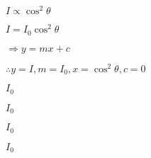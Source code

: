 \documentclass[10pt]{book}
\begin{document}
\begin{mdSnippets}
\begin{mdInlineSnippet}[54c828d34a9ab5de03d1bd36d06f8bfe]%
$I\propto\cos^2\theta$\end{mdInlineSnippet}%
\begin{mdInlineSnippet}[3988589845bbb41b96d667f353b3d1bb]%
$I=I_0\cos^2\theta$\end{mdInlineSnippet}%
\begin{mdInlineSnippet}[053a5864c12b37b85c25fc88ddcedfa4]%
$\Rightarrow y=mx+c$\end{mdInlineSnippet}%
\begin{mdInlineSnippet}[65261bf0f42cf0f16dcf6f6742361736]%
$\therefore y=I, m=I_0, x=\cos^2\theta, c=0$\end{mdInlineSnippet}%
\begin{mdInlineSnippet}%
$I_0$\end{mdInlineSnippet}%
\begin{mdInlineSnippet}%
$I_0$\end{mdInlineSnippet}%
\begin{mdInlineSnippet}%
$I_0$\end{mdInlineSnippet}%
\begin{mdInlineSnippet}%
$I_0$\end{mdInlineSnippet}%

\end{mdSnippets}
\end{document}
